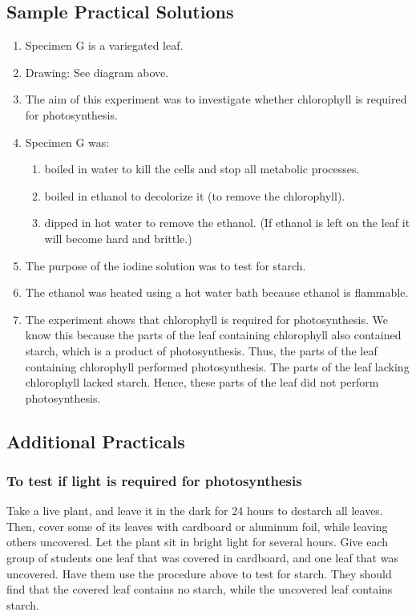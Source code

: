 \subsection{Sample Practical Solutions}
\begin{enumerate}
\item{Specimen G is a variegated leaf.}
\item{Drawing: See diagram above.}
\item{The aim of this experiment was to investigate whether chlorophyll is required for photosynthesis.}
\item{Specimen G was:}
\begin{enumerate}
\item{boiled in water to kill the cells and stop all metabolic processes.}
\item{boiled in ethanol to decolorize it (to remove the chlorophyll).}
\item{dipped in hot water to remove the ethanol. (If ethanol is left on the leaf it will become hard and brittle.)}
\end{enumerate}
\item{The purpose of the iodine solution was to test for starch.}
\item{The ethanol was heated using a hot water bath because ethanol is flammable.}
\item{The experiment shows that chlorophyll is required for photosynthesis. We know this because the parts of the leaf containing chlorophyll also contained starch, which is a product of photosynthesis. Thus, the parts of the leaf containing chlorophyll performed photosynthesis. The parts of the leaf lacking chlorophyll lacked starch. Hence, these parts of the leaf did not perform photosynthesis.}
\end{enumerate}

\subsection{Additional Practicals}
\subsubsection{To test if light is required for photosynthesis}

Take a live plant, and leave it in the dark for 24 hours to destarch all leaves. Then, cover some of its leaves with cardboard or aluminum foil, while leaving others uncovered. Let the plant sit in bright light for several hours. Give each group of students one leaf that was covered in cardboard, and one leaf that was uncovered. Have them use the procedure above to test for starch. They should find that the covered leaf contains no starch, while the uncovered leaf contains starch.

